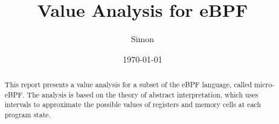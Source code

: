 \documentclass{article}
\title{Value Analysis for eBPF}
\author{Simon}
\date{\today}
\begin{document}
\maketitle

\begin{abstract}
This report presents a value analysis for a subset of the eBPF language, called
micro-eBPF. The analysis is based on the theory of abstract interpretation,
which uses intervals to approximate the possible values of registers and memory
cells at each program state.
\end{abstract}

\tableofcontents








\end{document}
